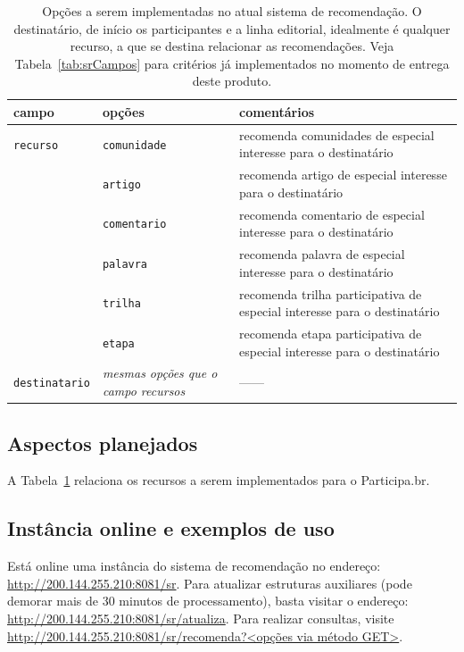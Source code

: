 \documentclass[12pt]{article}
\begin{document}
\begin{table}
\begin{center}
\begin{tabular}{|l|l|p{8cm}|}\hline
\textbf{campo} & \textbf{opções} & \textbf{comentários} \\\hline\hline
\texttt{recurso}       & \texttt{comunidade} & recomenda comunidades de especial interesse para o destinatário \\
                       & \texttt{artigo} & recomenda artigo de especial interesse para o destinatário               \\
                       & \texttt{comentario} & recomenda comentario de especial interesse para o destinatário               \\
                       & \texttt{palavra} & recomenda palavra de especial interesse para o destinatário               \\
                       & \texttt{trilha} & recomenda trilha participativa de especial interesse para o destinatário               \\
                       & \texttt{etapa} & recomenda etapa participativa de especial interesse para o destinatário               \\\hline
\texttt{destinatario}  & \emph{mesmas opções que o campo recursos} & ------    \\\hline
\end{tabular}
\caption[Table caption text]{Opções a serem implementadas no atual sistema de recomendação. O destinatário, de início os participantes e a linha editorial, idealmente é qualquer recurso, a que se destina relacionar as recomendações.
Veja Tabela~\ref{tab:srCampos} para critérios já implementados no momento de entrega deste produto.}
\label{tab:srCampos2}
\end{center}
\end{table}

\subsection{Aspectos planejados}\label{sec:plan}
A Tabela~\ref{tab:srCampos2} relaciona os recursos a serem implementados para o Participa.br.

\subsection{Instância online e exemplos de uso}
Está online uma instância do sistema de recomendação no endereço:
\url{http://200.144.255.210:8081/sr}. Para atualizar estruturas auxiliares (pode demorar mais de 30 minutos de processamento), basta visitar o endereço: \url{http://200.144.255.210:8081/sr/atualiza}. Para realizar consultas, visite \url{http://200.144.255.210:8081/sr/recomenda?<opções via método GET>}.
\end{document}

